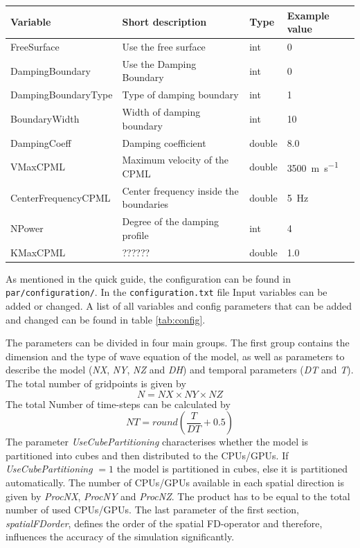 \documentclass[pdftex,a4paper,parskip,listof=totoc,bibliography=totoc,onehalfspacing,12pt]{scrreprt}
\newcommand{\shellcmd}[1]{\indent\indent\texttt{#1}}	%
\begin{document}
	 \begin{table}[h!]
\centering
\begin{adjustbox}{width=1\textwidth,center=\textwidth}
	\begin{tabular}{llll}
	\toprule
	  Variable & Short description & Type &Example value\;\;\;\\
	\midrule
	 FreeSurface& Use the free surface & int & \num{0}\\
	 DampingBoundary& Use the Damping Boundary & int & \num{0}\\
	 DampingBoundaryType& Type of damping boundary & int & \num{1}\\
	 BoundaryWidth& Width of damping boundary & int & \num{10}\\
	 DampingCoeff& Damping coefficient & double & \num{8.0}\\
	 VMaxCPML& Maximum velocity of the CPML & double &\SI{3500}{m\per s}\\
	 CenterFrequencyCPML\;\;\;\;& Center frequency inside the boundaries\;\;\;  & double &\SI{5}{Hz}\\
	 NPower& Degree of the damping profile & int &\num{4}\\
	 KMaxCPML& ?????? & double &\num{1.0}\\
    \bottomrule
	\end{tabular}
	\end{adjustbox}
\end{table}	

As mentioned in the quick guide, the configuration can be found in \shellcmd{par/configuration/}. In the \shellcmd{configuration.txt} file Input variables can be added or changed. A list of all variables and config parameters that can be added and changed can be found in table \ref{tab:config}.

The parameters can be divided in four main groups. The first group contains the dimension and the type of wave equation of the model, as well as parameters to describe the model (\textit{NX}, \textit{NY}, \textit{NZ} and \textit{DH}) and temporal parameters (\textit{DT} and \textit{T}). The total number of gridpoints is given by 
\begin{equation*}
	N=NX\times NY\times NZ
\end{equation*}
The total Number of time-steps can be calculated by 
\begin{equation*}
	NT = round\left(\frac{T}{DT}+0.5\right)
\end{equation*}
The parameter \textit{UseCubePartitioning} characterises whether the model is partitioned into cubes and then distributed to the CPUs/GPUs. If \textit{UseCubePartitioning} $=1$ the model is partitioned in cubes, else it is partitioned automatically. The number of CPUs/GPUs available in each spatial direction is given by \textit{ProcNX}, \textit{ProcNY} and \textit{ProcNZ}. The product has to be equal to the total number of used CPUs/GPUs. 
The last parameter of the first section, \textit{spatialFDorder}, defines the order of the spatial FD-operator and therefore, influences the accuracy of the simulation significantly.
\end{document}
